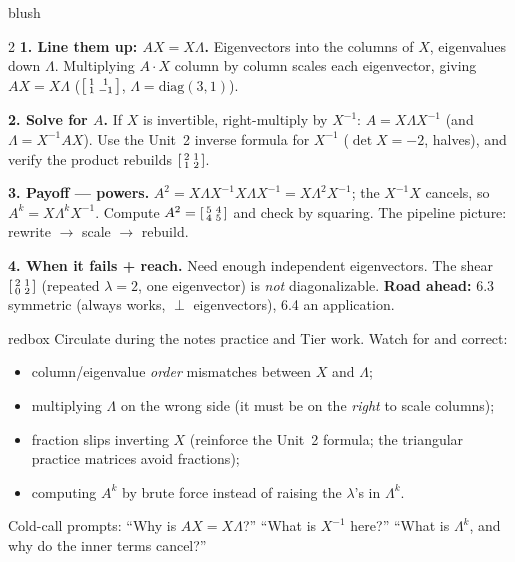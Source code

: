 \documentclass[10pt]{article}
\begin{document}
\begin{skillbox}[Lesson]{blush}
\begin{multicols}{2}
\textbf{1. Line them up: $AX=X\Lambda$.} Eigenvectors into the columns of $X$, eigenvalues down $\Lambda$.
Multiplying $A\cdot X$ column by column scales each eigenvector, giving $AX=X\Lambda$
($\begin{bsmallmatrix}1&1\\1&-1\end{bsmallmatrix}$, $\Lambda=\mathrm{diag}(3,1)$).

\textbf{2. Solve for $A$.} If $X$ is invertible, right-multiply by $X^{-1}$: $A=X\Lambda X^{-1}$ (and
$\Lambda=X^{-1}AX$). Use the Unit~2 inverse formula for $X^{-1}$ ($\det X=-2$, halves), and verify
the product rebuilds $\begin{bsmallmatrix}2&1\\1&2\end{bsmallmatrix}$.

\columnbreak

\textbf{3. Payoff --- powers.} $A^2=X\Lambda X^{-1}X\Lambda X^{-1}=X\Lambda^2X^{-1}$; the $X^{-1}X$
cancels, so $A^k=X\Lambda^k X^{-1}$. Compute $A^2=\begin{bsmallmatrix}5&4\\4&5\end{bsmallmatrix}$ and check
by squaring. The pipeline picture: rewrite $\to$ scale $\to$ rebuild.

\textbf{4. When it fails + reach.} Need enough independent eigenvectors. The shear
$\begin{bsmallmatrix}2&1\\0&2\end{bsmallmatrix}$ (repeated $\lambda=2$, one eigenvector) is \emph{not}
diagonalizable. \textbf{Road ahead:} 6.3 symmetric (always works, $\perp$ eigenvectors), 6.4 an application.
\end{multicols}
\end{skillbox}

\begin{skillbox}{redbox}
Circulate during the notes practice and Tier work. Watch for and correct:
\begin{itemize}[leftmargin=1.2em, nosep]
  \item column/eigenvalue \emph{order} mismatches between $X$ and $\Lambda$;
  \item multiplying $\Lambda$ on the wrong side (it must be on the \emph{right} to scale columns);
  \item fraction slips inverting $X$ (reinforce the Unit~2 formula; the triangular practice matrices avoid fractions);
  \item computing $A^k$ by brute force instead of raising the $\lambda$'s in $\Lambda^k$.
\end{itemize}
Cold-call prompts: ``Why is $AX=X\Lambda$?'' ``What is $X^{-1}$ here?'' ``What is $\Lambda^k$, and why do
the inner terms cancel?''
\end{skillbox}
\end{document}
